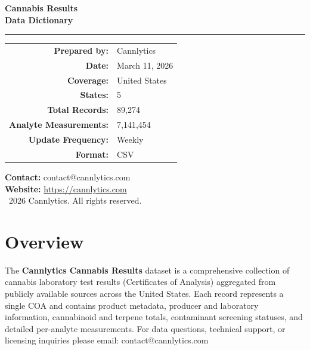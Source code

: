 \documentclass[11pt,letterpaper]{article}
\begin{document}
\begin{titlepage}
    \centering
    \vspace*{1.5cm}

    {\Huge\bfseries\textcolor{cannlyticsprimary}{Cannabis Results\\[0.5\baselineskip]Data Dictionary}}

    \rule{0.5\textwidth}{1pt}

    \vspace{0.5cm}

    {\large
    \begin{tabular}{rl}
    \textbf{Prepared by:} & Cannlytics \\[0.25cm]
    \textbf{Date:} & March 11, 2026 \\[0.25cm]
    \textbf{Coverage:} & United States \\[0.25cm]
    \textbf{States:} & 5 \\[0.25cm]
    \textbf{Total Records:} & 89,274 \\[0.25cm]
    \textbf{Analyte Measurements:} & 7,141,454 \\[0.25cm]
    \textbf{Update Frequency:} & Weekly \\[0.25cm]
    \textbf{Format:} & CSV \\
    \end{tabular}
    }

    \vfill

    \vspace{0.8cm}

    {\small\textcolor{cannlyticssecondary}{
    \textbf{Contact:} contact@cannlytics.com\\[0.25cm]
    \textbf{Website:} \url{https://cannlytics.com}\\[0.25cm]
    \textcopyright\ 2026 Cannlytics. All rights reserved.
    }}

\end{titlepage}

\section*{Overview}

The \textbf{Cannlytics Cannabis Results} dataset is a comprehensive
collection of cannabis laboratory test results (Certificates of
Analysis) aggregated from publicly available sources across the
United States. Each record represents a single COA and contains
product metadata, producer and laboratory information, cannabinoid
and terpene totals, contaminant screening statuses, and detailed
per-analyte measurements. For data questions, technical support,
or licensing inquiries please email: contact@cannlytics.com
\end{document}
